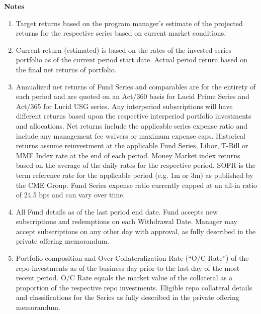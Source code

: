 \documentclass[9pt]{article}
\begin{document}
\onecolumn



\pagebreak 

\footnotesize
\noindent\textbf{\color{lucid_blue}Notes}

\begin{enumerate}
\item Target returns based on the program manager's estimate of the projected returns for the respective series based on current market conditions. 

\item Current return (estimated) is based on the rates of the invested series portfolio as of the current period start date.  Actual period return based on the final net returns of portfolio.   

\item Annualized net returns of Fund Series and comparables are for the entirety of each period and are quoted on an Act/360 basis for Lucid Prime Series and Act/365 for Lucid USG series. Any interperiod subscriptions will have different returns based upon the respective interperiod portfolio investments and allocations. Net returns include the applicable series expense ratio and include any management fee waivers or maximum expense caps. Historical returns assume reinvestment at the applicable Fund Series, Libor, T-Bill or MMF Index rate at the end of each period.  Money Market index returns based on the average of the daily rates for the respective period. SOFR is the term reference rate for the applicable period (e.g. 1m or 3m) as published by the CME Group. Fund Series expense ratio currently capped at an all-in ratio of 24.5 bps and can vary over time.

\item All Fund details as of the last period end date. Fund accepts new subscriptions and redemptions on each Withdrawal Date.  Manager may accept subscriptions on any other day with approval, as fully described in the private offering memorandum.

\item Portfolio composition and Over-Collateralization Rate (``O/C Rate'') of the repo investments as of the business day prior to the last day of the most recent period. O/C Rate equals the market value of the collateral as a proportion of the respective repo investments. Eligible repo collateral details and classifications for the Series as fully described in the private offering memorandum.

\end{enumerate}
\end{document}
